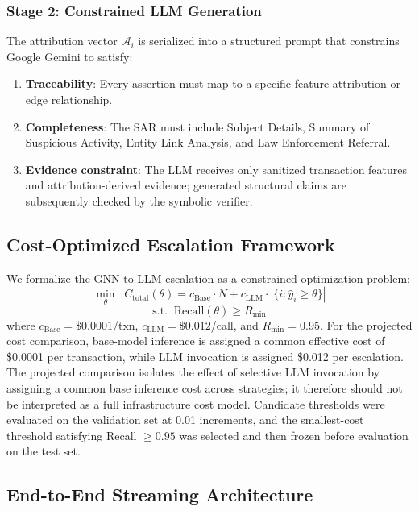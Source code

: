 \documentclass[journal]{IEEEtran}
\begin{document}
\subsubsection{Stage 2: Constrained LLM Generation}
The attribution vector $\mathcal{A}_i$ is serialized into a structured prompt that constrains Google Gemini to satisfy:
\begin{enumerate}
    \item \textbf{Traceability}: Every assertion must map to a specific feature attribution or edge relationship.
    \item \textbf{Completeness}: The SAR must include Subject Details, Summary of Suspicious Activity, Entity Link Analysis, and Law Enforcement Referral.
    \item \textbf{Evidence constraint}: The LLM receives only sanitized transaction features and attribution-derived evidence; generated structural claims are subsequently checked by the symbolic verifier.
\end{enumerate}

\subsection{Cost-Optimized Escalation Framework}
\label{sec:cost}

We formalize the GNN-to-LLM escalation as a constrained optimization problem:
\begin{equation}
\min_\theta \;\; C_{\text{total}}(\theta) = c_{\text{Base}} \cdot N + c_{\text{LLM}} \cdot |\{i : \hat{y}_i \geq \theta\}|
\end{equation}
\begin{equation}
\text{s.t.} \;\; \text{Recall}(\theta) \geq R_{\min}
\end{equation}
where $c_{\text{Base}} = \$0.0001$/txn, $c_{\text{LLM}} = \$0.012$/call, and $R_{\min} = 0.95$. For the projected cost comparison, base-model inference is assigned a common effective cost of \$0.0001 per transaction, while LLM invocation is assigned \$0.012 per escalation. The projected comparison isolates the effect of selective LLM invocation by assigning a common base inference cost across strategies; it therefore should not be interpreted as a full infrastructure cost model. Candidate thresholds were evaluated on the validation set at 0.01 increments, and the smallest-cost threshold satisfying Recall $\ge 0.95$ was selected and then frozen before evaluation on the test set.

\subsection{End-to-End Streaming Architecture}
\label{sec:architecture}
\end{document}
